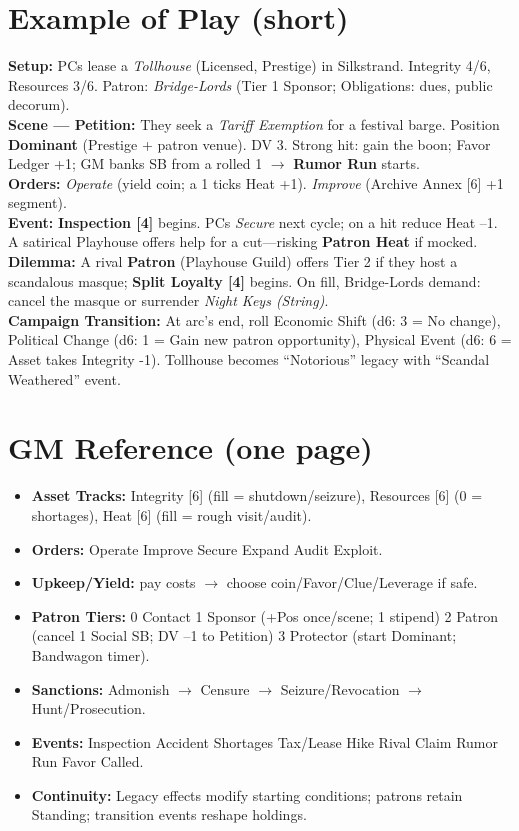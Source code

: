\documentclass[10pt]{article}
\begin{document}
    \section{Example of Play (short)}
    \textbf{Setup:} PCs lease a \emph{Tollhouse} (Licensed, Prestige) in Silkstrand. Integrity 4/6, Resources 3/6. Patron: \emph{Bridge-Lords} (Tier 1 Sponsor; Obligations: dues, public decorum).\\
    \textbf{Scene --- Petition:} They seek a \emph{Tariff Exemption} for a festival barge. Position \textbf{Dominant} (Prestige + patron venue). DV 3. Strong hit: gain the boon; Favor Ledger +1; GM banks SB from a rolled 1 $\to$ \textbf{Rumor Run} starts.\\
    \textbf{Orders:} \emph{Operate} (yield coin; a 1 ticks Heat +1). \emph{Improve} (Archive Annex [6] +1 segment).\\
    \textbf{Event:} \textbf{Inspection [4]} begins. PCs \emph{Secure} next cycle; on a hit reduce Heat --1. A satirical Playhouse offers help for a cut---risking \textbf{Patron Heat} if mocked.\\
    \textbf{Dilemma:} A rival \textbf{Patron} (Playhouse Guild) offers Tier 2 if they host a scandalous masque; \textbf{Split Loyalty [4]} begins. On fill, Bridge-Lords demand: cancel the masque or surrender \emph{Night Keys (String)}.\\
    \textbf{Campaign Transition:} At arc's end, roll Economic Shift (d6: 3 = No change), Political Change (d6: 1 = Gain new patron opportunity), Physical Event (d6: 6 = Asset takes Integrity -1). Tollhouse becomes ``Notorious'' legacy with ``Scandal Weathered'' event.
    
    \section*{GM Reference (one page)}
    \begin{itemize}
      \item \textbf{Asset Tracks:} Integrity [6] (fill = shutdown/seizure), Resources [6] (0 = shortages), Heat [6] (fill = rough visit/audit).
      \item \textbf{Orders:} Operate \textbullet{} Improve \textbullet{} Secure \textbullet{} Expand \textbullet{} Audit \textbullet{} Exploit.
      \item \textbf{Upkeep/Yield:} pay costs $\to$ choose coin/Favor/Clue/Leverage if safe.
      \item \textbf{Patron Tiers:} 0 Contact \textbullet{} 1 Sponsor (+Pos once/scene; 1 stipend) \textbullet{} 2 Patron (cancel 1 Social SB; DV --1 to Petition) \textbullet{} 3 Protector (start Dominant; Bandwagon timer).
      \item \textbf{Sanctions:} Admonish $\to$ Censure $\to$ Seizure/Revocation $\to$ Hunt/Prosecution.
      \item \textbf{Events:} Inspection \textbullet{} Accident \textbullet{} Shortages \textbullet{} Tax/Lease Hike \textbullet{} Rival Claim \textbullet{} Rumor Run \textbullet{} Favor Called.
      \item \textbf{Continuity:} Legacy effects modify starting conditions; patrons retain Standing; transition events reshape holdings.
    \end{itemize}
    
\end{document}
